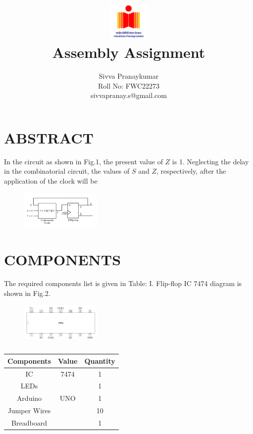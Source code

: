 \documentclass[conference]{IEEEtran}
\title{
\vspace{1cm}
{\includegraphics[width=0.15\textwidth]{IMG-20241021-WA0004} \\ Assembly Assignment} }
\author{Sivva Pranaykumar \\ Roll No: FWC22273 \\ sivvapranay.s@gmail.com}
\begin{document}
\maketitle
 \section {ABSTRACT}
 In the circuit as shown in Fig.1, the present value of $Z$ is 1. Neglecting the delay in the combinatorial circuit, the values of $S$ and $Z$, respectively, after the application of the clock will be
 \begin {figure} [h]
 \centering
 \includegraphics[width=0.35\textwidth]{IMG-20241021-WA0008   }
 \caption{\label{fig:Gates}}
 \end {figure}
\section{COMPONENTS}
The required components list is given in Table: I. Flip-flop IC 7474 diagram is shown in Fig.2.
\begin{figure}[h]
\centering
\includegraphics[width=0.35\textwidth]{IMG-20241021-WA0003}
\caption{\label{fig:Gates}}
\end{figure}
 \begin{table} [htbp]
\centering
\begin{tabular}{| c | c | c |} \hline
Components & Value & Quantity \\\hline
IC & 7474 & 1 \\ \hline
LEDs &  & 1 \\ \hline
Arduino & UNO & 1 \\ \hline
Jumper Wires &  & 10 \\ \hline
Breadboard & & 1 \\ 
\hline
\end{tabular}
\vspace{0.1cm}
\caption{\label{tab:widgets}}
\end{table}
\end{document}
